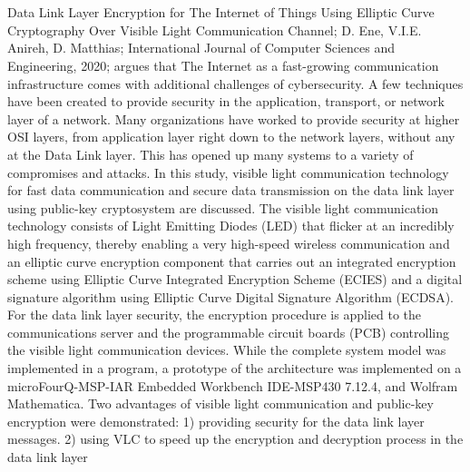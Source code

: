 \documentclass[12pt]{article}
\begin{document}
\\ \\
Data Link Layer Encryption for The Internet of Things Using Elliptic Curve Cryptography Over Visible Light Communication Channel; D. Ene, V.I.E. Anireh, D. Matthias; International Journal of Computer Sciences and Engineering, 2020; argues that The  Internet  as a fast-growing communication  infrastructure  comes  with additional  challenges of cybersecurity.  A few  techniques  have  been  created  to  provide  security  in  the  application,  transport,  or  network  layer  of  a  network.  Many organizations  have  worked  to provide  security  at  higher  OSI  layers, from application layer right down to the network layers, without  any  at  the  Data  Link  layer.  This  has  opened  up  many  systems  to  a  variety  of  compromises  and  attacks. In  this  study,  visible  light  communication  technology  for  fast  data  communication  and  secure  data transmission on the  data  link  layer using public-key cryptosystem are  discussed. The  visible  light communication technology consists  of  Light  Emitting  Diodes  (LED)  that  flicker  at  an  incredibly  high  frequency,  thereby  enabling  a  very  high-speed wireless  communication  and  an  elliptic  curve encryption component that carries  out an  integrated  encryption  scheme  using Elliptic Curve Integrated Encryption Scheme (ECIES) and a digital signature algorithm using Elliptic Curve Digital Signature Algorithm (ECDSA). For the data link layer security, the encryption procedure is applied to the communications server and the programmable circuit boards (PCB) controlling the visible light communication devices. While the complete system model was implemented  in  a  program,  a  prototype  of  the  architecture  was  implemented  on  a microFourQ-MSP-IAR  Embedded Workbench IDE-MSP430 7.12.4, and Wolfram Mathematica. Two advantages of visible light communication and public-key encryption were demonstrated: 1) providing security for the data link layer messages. 2) using VLC to speed up the encryption and decryption process in the data link layer
\end{document}
